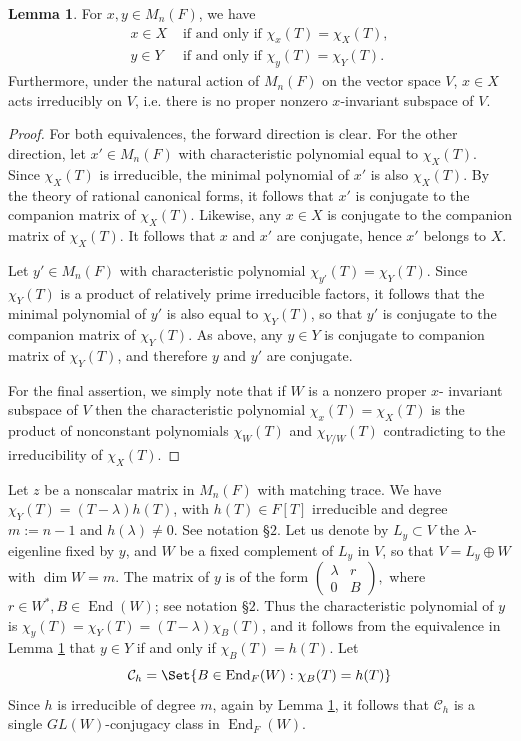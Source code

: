 \documentclass[preprint,11pt]{amsart}
\newcommand{\CalC}{\mathcal{C}}
\theoremstyle{definition}
\numberwithin{thm}{section}
\newtheorem{lem}[thm]{Lemma}
\newcommand{\End}{\operatorname{End}}
\newcommand{\trm}[1]{\textrm{#1}}
\newcommand{\lam}{\lambda}
\newcommand{\sub}{\subset}
\begin{document}
\begin{lem}\label{conjugacy_characteristic_equivalence}
For $x,y \in M_n(F)$, we have
\begin{align*}
x \in X & \trm{ if and only if } \chi_x(T) = \chi_X(T), \\
y \in Y & \trm{ if and only if } \chi_y(T) = \chi_Y(T).
\end{align*}
Furthermore, under the natural action of $M_n(F)$ on the vector space $V$,  $x \in X$ acts irreducibly on $V$, i.e. there is no proper nonzero $x$-invariant subspace of $V$.
\end{lem}
\begin{proof}
For both equivalences, the forward direction is clear. For the other direction, let $x' \in M_n(F)$ with characteristic polynomial equal to $\chi_X(T)$. Since $\chi_X(T)$ is irreducible, the minimal polynomial of $x'$ is also $\chi_X(T)$. By the theory of rational canonical forms, it follows that $x'$ is conjugate to the companion matrix of $\chi_X(T)$. Likewise, any $x \in X$ is conjugate to the companion matrix of $\chi_X(T)$. It follows that $x$ and $x'$ are conjugate, hence $x'$ belongs to $X$.

Let $y' \in M_n(F)$ with characteristic polynomial $\chi_{y'}(T) = \chi_Y(T)$. Since $\chi_Y(T)$ is a product of relatively prime irreducible factors, it follows that the minimal polynomial of $y'$ is also equal to $\chi_Y(T)$, so that $y'$ is conjugate to the companion matrix of $\chi_Y(T)$. As above, any $y \in Y$ is conjugate to companion matrix of $\chi_Y(T)$, and therefore $y$ and $y'$ are conjugate. 


For the final assertion, we simply note that if $W$ is a nonzero proper $x$- invariant subspace of $V$ then the characteristic polynomial $\chi_x(T) = \chi_X(T)$ is the product of nonconstant polynomials $\chi_W(T)$ and $\chi_{V/W}(T)$ contradicting to the irreducibility of $\chi_X(T)$.
\end{proof}
Let $z$ be a nonscalar matrix in $M_n(F)$ with matching trace. We have $\chi_Y(T) = (T- \lam) h(T)$, with $h(T) \in F[T]$ irreducible and degree $m := n-1$ and $h(\lam) \neq 0$. See notation \S $2$. Let us denote by $L_y \sub V$ the $\lam$-eigenline fixed by $y$, and $W$ be a fixed complement of $L_y$ in $V$, so that $V = L_y \oplus W$ with $\dim W = m$. The matrix of $y$ is of the form 
$
\begin{pmatrix} \lam & r  \\ 0 & B \end{pmatrix},
$
where $r \in W^*, B \in \End(W)$; see notation \S $2$. Thus the characteristic polynomial of $y$ is $\chi_y(T) = \chi_Y(T) = (T- \lam) \chi_B(T)$, and it follows from the equivalence in Lemma \ref{conjugacy_characteristic_equivalence} that $y \in Y$ if and only if $\chi_B(T) = h(T)$. Let 
$$
\CalC_h = \Set{B \in \End_{F}(W) : \chi_B(T) = h(T)}
$$
Since $h$ is irreducible of degree $m$, again by Lemma \ref{conjugacy_characteristic_equivalence}, it follows that  $\CalC_h$ is a single $GL(W)$-conjugacy class in $\End_{F}(W)$.
\end{document}
